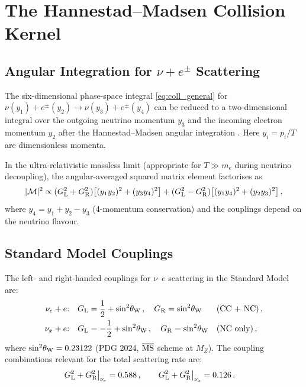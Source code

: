 \section{The Hannestad--Madsen Collision Kernel}\label{sec:hannestad_madsen}

\subsection{\texorpdfstring{Angular Integration for $\nu + e^\pm$ Scattering}{Angular Integration for nu + e scattering}}

The six-dimensional phase-space integral \eqref{eq:coll_general} for $\nu(y_1) + e^\pm(y_2) \to \nu(y_3) + e^\pm(y_4)$ can be reduced to a two-dimensional integral over the outgoing neutrino momentum $y_3$ and the incoming electron momentum $y_2$ after the Hannestad--Madsen angular integration \cite{HannestadMadsen1995}.  Here $y_i = p_i/T$ are dimensionless momenta.

In the ultra-relativistic massless limit (appropriate for $T \gg m_e$ during neutrino decoupling), the angular-averaged squared matrix element factorises as
\begin{equation}
|\mathcal{M}|^2 \propto (G_{\rm L}^2 + G_{\rm R}^2)\bigl[(y_1 y_2)^2 + (y_3 y_4)^2\bigr] + (G_{\rm L}^2 - G_{\rm R}^2)\bigl[(y_1 y_4)^2 + (y_2 y_3)^2\bigr]\,,\label{eq:M2_scat}
\end{equation}
where $y_4 = y_1 + y_2 - y_3$ (4-momentum conservation) and the couplings depend on the neutrino flavour.

\subsection{Standard Model Couplings}

The left- and right-handed couplings for $\nu$--$e$ scattering in the Standard Model are:
\begin{align}
\text{$\nu_e + e$:}\quad &G_{\rm L} = \frac{1}{2} + \sin^2\!\theta_{\rm W}\,,\quad G_{\rm R} = \sin^2\!\theta_{\rm W} && \text{(CC + NC)}\,,\\
\text{$\nu_x + e$:}\quad &G_{\rm L} = -\frac{1}{2} + \sin^2\!\theta_{\rm W}\,,\quad G_{\rm R} = \sin^2\!\theta_{\rm W} && \text{(NC only)}\,,
\end{align}
where $\sin^2\!\theta_{\rm W} = 0.23122$ (PDG 2024, $\overline{\rm MS}$ scheme at $M_Z$).  The coupling combinations relevant for the total scattering rate are:
\begin{align}
G_{\rm L}^2 + G_{\rm R}^2\big|_{\nu_e} &= 0.588\,,\qquad G_{\rm L}^2 + G_{\rm R}^2\big|_{\nu_x} = 0.126\,.
\end{align}

